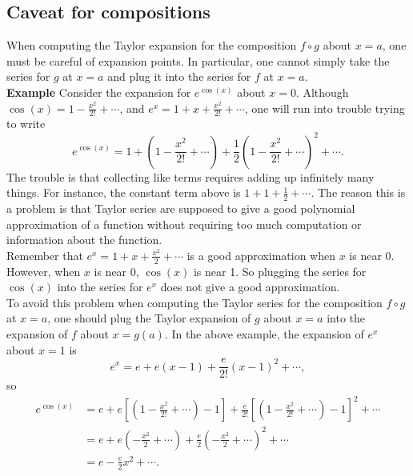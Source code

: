 \documentclass[a4paper]{book}
\begin{document}
\begin{sloppypar}
\subsection{Caveat for compositions}
When computing the Taylor expansion for the composition $f \circ g$ about $x=a$, one must be careful of expansion points. In particular, one cannot simply take the series for $g$ at $x=a$ and plug it into the series for $f$ at $x=a$.\\
\textbf{Example} Consider the expansion for $e^{\cos(x)}$ about $x=0$. Although $\cos(x) = 1-\frac{x^2}{2!} +\dotsb$, and $e^x = 1+x+\frac{x^2}{2!}+\dotsb$, one will run into trouble trying to write
\begin{equation*}
e^{\cos(x)} = 1+(1-\frac{x^2}{2!} +\dotsb) + \frac{1}{2}(1-\frac{x^2}{2!} +\dotsb)^2 + \dotsb.
\end{equation*}
The trouble is that collecting like terms requires adding up infinitely many things. For instance, the constant term above is $1+1+\frac{1}{2}+\dotsb$. The reason this is a problem is that Taylor series are supposed to give a good polynomial approximation of a function without requiring too much computation or information about the function.\\
Remember that $e^x = 1+x+\frac{x^2}{2}+\dotsb$ is a good approximation when $x$ is near 0. However, when $x$ is near 0, $\cos(x)$ is near 1. So plugging the series for $\cos(x)$ into the series for $e^x$ does not give a good approximation. \\
To avoid this problem when computing the Taylor series for the composition $f \circ g$ at $x=a$, one should plug the Taylor expansion of $g$ about $x=a$ into the expansion of $f$ about $x=g(a)$. In the above example, the expansion of $e^x$ about $x=1$ is
\begin{equation*}
e^x = e + e(x-1) + \frac{e}{2!}(x-1)^2 + \dotsb,
\end{equation*}
so
\begin{align*}
e^{\cos(x)} &= e + e\left[\left(1-\frac{x^2}{2!}+\dotsb\right)-1\right] + \frac{e}{2!}\left[\left(1-\frac{x^2}{2!}+\dotsb\right)-1\right]^2 + \dotsb \\
&= e + e(-\frac{x^2}{2} + \dotsb) + \frac{e}{2}(-\frac{x^2}{2}+\dotsb)^2 + \dotsb \\
&= e - \frac{e}{2}x^2 + \dotsb.
\end{align*}

\end{sloppypar}
\end{document}
